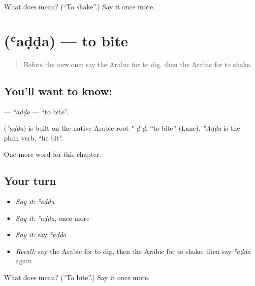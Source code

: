 \begin{tcolorbox}[breakable,colback=teal!4,colframe=teal!35!black,title={Before you move on}]
What does  mean? (\textquotedblleft{}To shake\textquotedblright{}.) Say it once more.
\end{tcolorbox}
\section[\texorpdfstring{\ar{عض} (ʿaḍḍa)}{عض (ʿaḍḍa)}]{ (ʿaḍḍa) — to bite}

\label{lesson:AR-C199-adda}



\begin{quote}
Before the new one: say the Arabic for to dig, then the Arabic for to shake.
\end{quote}

\subsection*{You'll want to know: }
\textbf{} — \emph{ʿaḍḍa} — \textquotedblleft{}to bite\textquotedblright{}.

\begin{cousinweb}
\textbf{} (\emph{ʿaḍḍa}) is built on the native Arabic root \emph{ʿ-ḍ-ḍ}, \textquotedblleft{}to bite\textquotedblright{} (Lane). \emph{ʿAḍḍa} is the plain verb, \textquotedblleft{}he bit\textquotedblright{}.
\end{cousinweb}

\begin{grammarlens}[title={What you've built}]
One more word for this chapter.
\end{grammarlens}

\subsection*{Your turn}
\begin{itemize}
\raggedright
  \item \emph{Say it:} \emph{ʿaḍḍa}
  \item \emph{Say it:} \emph{ʿaḍḍa}, once more
  \item \emph{Say it:} say \emph{ʿaḍḍa}
  \item \emph{Recall:} say the Arabic for to dig, then the Arabic for to shake, then say \emph{ʿaḍḍa} again
\end{itemize}

\begin{tcolorbox}[breakable,colback=teal!4,colframe=teal!35!black,title={Before you move on}]
What does  mean? (\textquotedblleft{}To bite\textquotedblright{}.) Say it once more.
\end{tcolorbox}

